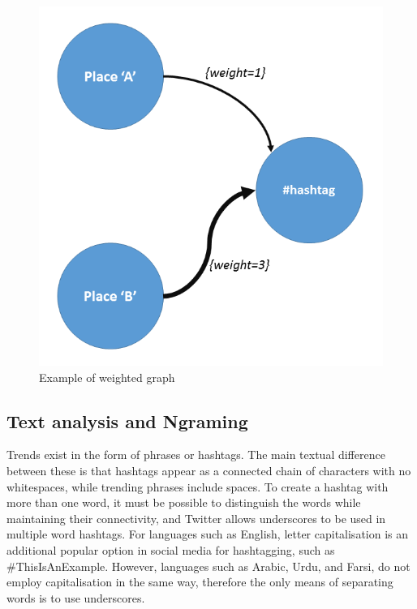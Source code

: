 \documentclass[conference]{IEEEtran}
\begin{document}


\begin{figure}[htb] \centering
\includegraphics[width=\columnwidth]{images/w_graph.png}
\caption{Example of weighted graph}
\label{fig:w_graph}
\end{figure}


\subsection{Text analysis and Ngraming}

Trends exist in the form of phrases or hashtags. The main textual
difference between these is that hashtags appear as a connected chain
of characters with no whitespaces, while trending phrases include
spaces. To create a hashtag with more than one word, it must be
possible to distinguish the words while maintaining their
connectivity, and Twitter allows underscores to be used in multiple
word hashtags. For languages such as English, letter capitalisation is
an additional popular option in social media for hashtagging, such as
\#ThisIsAnExample. However, languages such as Arabic, Urdu, and Farsi,
do not employ capitalisation in the same way, therefore the only means
of separating words is to use underscores.  
\end{document}
